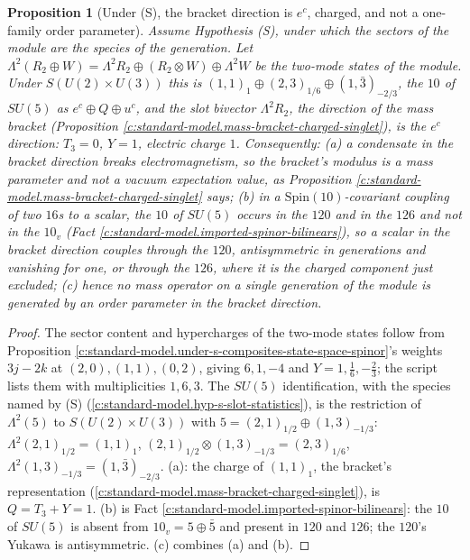 \documentclass[11pt]{article}
\newtheorem{proposition}[theorem]{Proposition}
\theoremstyle{definition}
\theoremstyle{plain}
\newcommand{\changedmark}[2]{\marginpar{\raggedright\scriptsize\color{#1}#2}}
\begin{document}
\begin{proposition}[Under (S), the bracket direction is $e^{c}$, charged, and not a one-family order parameter]\label{c:standard-model.under-s-bracket-direction-charged-not}
\changedmark{gray}{reworded}
Assume Hypothesis (S), under which the sectors of the module are the species of the generation. Let $\Lambda^{2}(R_{2} \oplus W) = \Lambda^{2}R_{2} \oplus (R_{2} \otimes W) \oplus \Lambda^{2}W$ be the two-mode states of the module. Under $S(U(2) \times U(3))$ this is $(1,1)_{1} \oplus (2,3)_{1/6} \oplus (1,\bar{3})_{-2/3}$, the $10$ of $SU(5)$ as $e^{c} \oplus Q \oplus u^{c}$, and the slot bivector $\Lambda^{2}R_{2}$, the direction of the mass bracket (Proposition \ref{c:standard-model.mass-bracket-charged-singlet}), is the $e^{c}$ direction: $T_{3} = 0$, $Y = 1$, electric charge $1$. Consequently: (a) a condensate in the bracket direction breaks electromagnetism, so the bracket's modulus is a mass parameter and not a vacuum expectation value, as Proposition \ref{c:standard-model.mass-bracket-charged-singlet} says; (b) in a $\mathrm{Spin}(10)$-covariant coupling of two $16$s to a scalar, the $10$ of $SU(5)$ occurs in the $120$ and in the $126$ and not in the $10_{v}$ (Fact \ref{c:standard-model.imported-spinor-bilinears}), so a scalar in the bracket direction couples through the $120$, antisymmetric in generations and vanishing for one, or through the $126$, where it is the charged component just excluded; (c) hence no mass operator on a single generation of the module is generated by an order parameter in the bracket direction.
\end{proposition}
\begin{proof}
The sector content and hypercharges of the two-mode states follow from Proposition \ref{c:standard-model.under-s-composites-state-space-spinor}'s weights $3j - 2k$ at $(2,0), (1,1), (0,2)$, giving $6, 1, -4$ and $Y = 1, \tfrac16, -\tfrac23$; the script lists them with multiplicities $1, 6, 3$. The $SU(5)$ identification, with the species named by (S) (\ref{c:standard-model.hyp-s-slot-statistics}), is the restriction of $\Lambda^{2}(5)$ to $S(U(2) \times U(3))$ with $5 = (2,1)_{1/2} \oplus (1,3)_{-1/3}$: $\Lambda^{2}(2,1)_{1/2} = (1,1)_{1}$, $(2,1)_{1/2} \otimes (1,3)_{-1/3} = (2,3)_{1/6}$, $\Lambda^{2}(1,3)_{-1/3} = (1,\bar{3})_{-2/3}$. (a): the charge of $(1,1)_{1}$, the bracket's representation (\ref{c:standard-model.mass-bracket-charged-singlet}), is $Q = T_{3} + Y = 1$. (b) is Fact \ref{c:standard-model.imported-spinor-bilinears}: the $10$ of $SU(5)$ is absent from $10_{v} = 5 \oplus \bar{5}$ and present in $120$ and $126$; the $120$'s Yukawa is antisymmetric. (c) combines (a) and (b).

\end{proof}
\end{document}
